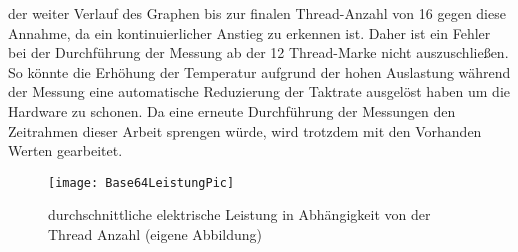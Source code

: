 der weiter Verlauf des Graphen bis zur finalen Thread-Anzahl von 16 gegen diese Annahme, da ein kontinuierlicher Anstieg zu erkennen ist. Daher ist ein Fehler bei der Durchführung der Messung ab der 12 Thread-Marke nicht auszuschließen. So könnte die Erhöhung der Temperatur aufgrund der hohen Auslastung während der Messung eine automatische Reduzierung der Taktrate ausgelöst haben um die Hardware zu schonen. Da eine erneute Durchführung der Messungen den Zeitrahmen dieser Arbeit sprengen würde, wird trotzdem mit den Vorhanden Werten gearbeitet. 


\begin{figure}[h]
	\begin{center}	 
	\texttt{[image: Base64LeistungPic]}
	\caption{durchschnittliche elektrische Leistung in Abhängigkeit von der Thread Anzahl (eigene Abbildung)}
	\label{fig:Base64LeistungPic} 
	\end{center}
\end{figure}


